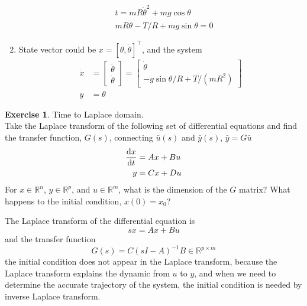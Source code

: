 \documentclass[11pt,a4paper]{report}
\theoremstyle{definition}\newtheorem{exercise}{Exercise}[chapter]
\begin{document}
\begin{answer}
\begin{enumerate}[label=(\alph*)]
    \begin{align}
        &t=mR\dot\theta^2+mg\cos\theta\\
        &mR\ddot\theta-T/R+mg\sin\theta=0
    \end{align}
    \item State vector could be $x=[\theta,\dot \theta]^\top$, and the system
    \begin{align}
        \dot x&=\begin{bmatrix}
            \dot \theta\\
            \ddot \theta
        \end{bmatrix}=
        \begin{bmatrix}
            \dot \theta\\
            -g\sin\theta/R+T/\left(mR^2\right)
        \end{bmatrix}\\
        y&=\theta
    \end{align}
\end{enumerate}
\end{answer}

\begin{exercise} Time to Laplace domain.\\
Take the Laplace transform of the following set of differential equations and find the transfer function, $G(s)$, connecting $\bar u(s)$ and $\bar y(s)$, $\bar y=G\bar u$
\begin{align}\label{equ:exer1-4}
    \dv{x}{t}&=Ax+Bu\\
    y&=Cx+Du
\end{align}
For $x\in\mathbb R^n$, $y\in\mathbb R^p$, and $u\in\mathbb R^m$, what is the dimension of the $G$ matrix? What happens to the initial condition, $x(0)=x_0$? 
\end{exercise}

\begin{answer}
The Laplace transform of the differential equation is 
\begin{equation}
    sx=Ax+Bu
\end{equation}
and the transfer function
\begin{equation}
    G(s)=C(sI-A)^{-1}B\in\mathbb{R}^{p\times m}
\end{equation}
the initial condition does not appear in the Laplace transform, because the Laplace transform explains the dynamic from $u$ to $y$, and when we need to determine the accurate trajectory of the system, the initial condition is needed by inverse Laplace transform.
\end{answer}
\end{document}
